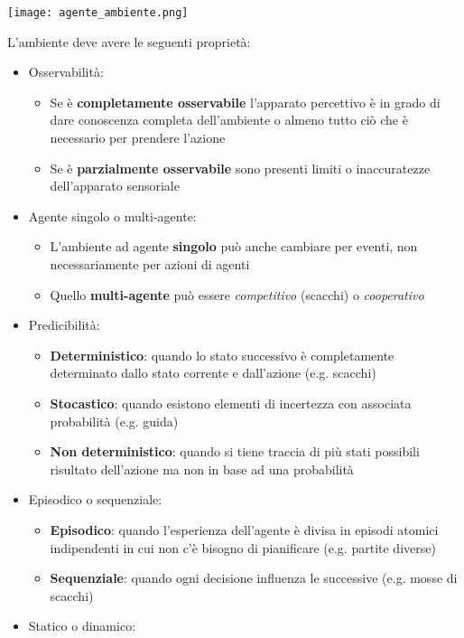 \begin{center}
	\texttt{[image: agente\_ambiente.png]}
\end{center}

L'ambiente deve avere le seguenti proprietà:
\begin{itemize}
	\item Osservabilità:
	\begin{itemize}
		\item Se è \textbf{completamente osservabile} l'apparato percettivo è in grado di dare conoscenza completa dell'ambiente o almeno tutto ciò che è necessario per prendere l'azione
		\item Se è \textbf{parzialmente osservabile} sono presenti limiti o inaccuratezze dell'apparato sensoriale
	\end{itemize}
	\item Agente singolo o multi-agente:
	\begin{itemize}
		\item L'ambiente ad agente \textbf{singolo} può anche cambiare per eventi, non
		necessariamente per azioni di agenti
		\item Quello \textbf{multi-agente} può essere \emph{competitivo} (scacchi) o \emph{cooperativo}
	\end{itemize}
	\item Predicibilità:
	\begin{itemize}
		\item \textbf{Deterministico}: quando lo stato successivo è completamente determinato dallo stato corrente e dall’azione (e.g. scacchi)
		\item \textbf{Stocastico}: quando esistono elementi di incertezza con associata probabilità (e.g. guida)
		\item \textbf{Non deterministico}: quando si tiene traccia di più stati possibili risultato dell’azione ma non in base ad una probabilità
	\end{itemize}
	\item Episodico o sequenziale:
	\begin{itemize}
		\item \textbf{Episodico}: quando l’esperienza dell’agente è divisa in episodi atomici
		indipendenti in cui non c'è bisogno di pianificare (e.g. partite diverse)
		\item \textbf{Sequenziale}: quando ogni decisione influenza le successive (e.g. mosse di scacchi)
	\end{itemize}
	\item Statico o dinamico:

\end{itemize}
